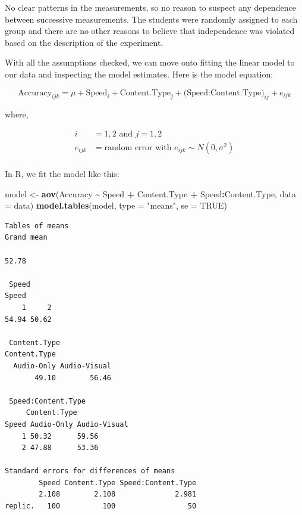 \documentclass[
  letterpaper,
]{book}
\newenvironment{Shaded}{\begin{snugshade}}{\end{snugshade}}
\newcommand{\AttributeTok}[1]{\textcolor[rgb]{0.13,0.29,0.53}{#1}}
\newcommand{\ConstantTok}[1]{\textcolor[rgb]{0.56,0.35,0.01}{#1}}
\newcommand{\FunctionTok}[1]{\textcolor[rgb]{0.13,0.29,0.53}{\textbf{#1}}}
\newcommand{\NormalTok}[1]{#1}
\newcommand{\OtherTok}[1]{\textcolor[rgb]{0.56,0.35,0.01}{#1}}
\newcommand{\SpecialCharTok}[1]{\textcolor[rgb]{0.81,0.36,0.00}{\textbf{#1}}}
\newcommand{\StringTok}[1]{\textcolor[rgb]{0.31,0.60,0.02}{#1}}
\begin{document}
No clear patterns in the measurements, so no reason to suspect any
dependence between successive measurements. The students were randomly
assigned to each group and there are no other reasons to believe that
independence was violated based on the description of the experiment.

With all the assumptions checked, we can move onto fitting the linear
model to our data and inspecting the model estimates. Here is the model
equation:

\[ \text{Accuracy}_{ijk} = \mu + \text{Speed}_i + \text{Content.Type}_j + \text{(Speed:Content.Type)}_{ij} + e_{ijk} \]

where,

\[
\begin{aligned}
    i &= 1,2\text{ and }j = 1,2\\
    e_{ijk} &= \text{random error with } e_{ijk} \sim N(0, \sigma^2) \\
\end{aligned}
\]

In R, we fit the model like this:

\begin{Shaded}
\begin{Highlighting}[]
\NormalTok{model }\OtherTok{\textless{}{-}} \FunctionTok{aov}\NormalTok{(Accuracy }\SpecialCharTok{\textasciitilde{}}\NormalTok{ Speed }\SpecialCharTok{+}\NormalTok{ Content.Type }\SpecialCharTok{+}\NormalTok{ Speed}\SpecialCharTok{:}\NormalTok{Content.Type, }\AttributeTok{data =}\NormalTok{ data)}
\FunctionTok{model.tables}\NormalTok{(model, }\AttributeTok{type =} \StringTok{"means"}\NormalTok{, }\AttributeTok{se =} \ConstantTok{TRUE}\NormalTok{)}
\end{Highlighting}
\end{Shaded}

\begin{verbatim}
Tables of means
Grand mean
      
52.78 

 Speed 
Speed
    1     2 
54.94 50.62 

 Content.Type 
Content.Type
  Audio-Only Audio-Visual 
       49.10        56.46 

 Speed:Content.Type 
     Content.Type
Speed Audio-Only Audio-Visual
    1 50.32      59.56       
    2 47.88      53.36       

Standard errors for differences of means
        Speed Content.Type Speed:Content.Type
        2.108        2.108              2.981
replic.   100          100                 50
\end{verbatim}
\end{document}
